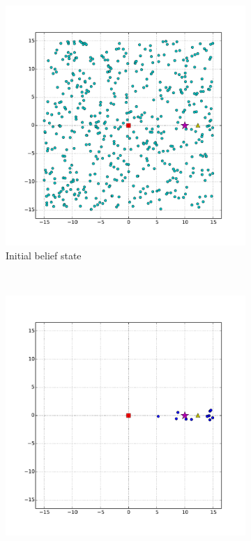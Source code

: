 
\begin{figure}
        \centering
        \begin{subfigure}[b]{0.3\textwidth}
                \includegraphics[width=\textwidth]{bad_range_initial}
                \caption{Initial belief state}
                \label{fig:bad_range_init}
        \end{subfigure}%
        ~ %
        \begin{subfigure}[b]{0.3\textwidth}
                \includegraphics[width=\textwidth]{bad_range_first_obs}

\end{subfigure}
\end{figure}
